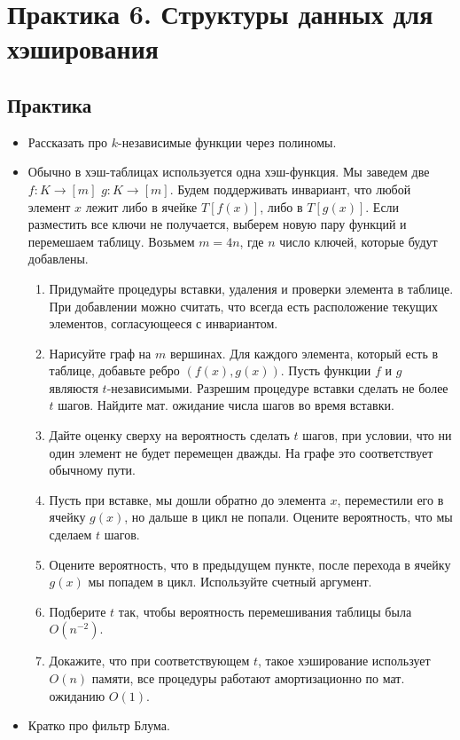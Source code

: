 \section{Практика 6. Структуры данных для хэширования}

\subsection{Практика}

\begin{itemize}
  \item Рассказать про $k$-независимые функции через полиномы.
 
  \item Обычно в хэш-таблицах используется одна хэш-функция. Мы заведем две $f : K \rightarrow [m]$
   $g : K \rightarrow [m]$. Будем поддерживать инвариант, что любой элемент $x$ лежит либо в ячейке
    $T[f(x)]$, либо в $T[g(x)]$. Если разместить все ключи не получается, выберем
    новую пару функций и перемешаем таблицу. Возьмем $m = 4n$, где $n$ число ключей,
    которые будут добавлены.

    \begin{enumerate}
      \item Придумайте процедуры вставки, удаления и проверки элемента в 
        таблице. При добавлении можно считать, что всегда есть расположение текущих
        элементов, согласующееся с инвариантом.

      \item Нарисуйте граф на $m$ вершинах. Для каждого элемента, который есть в таблице,
        добавьте ребро $(f(x), g(x))$. Пусть функции $f$ и $g$ являюстя $t$-независимыми.
        Разрешим процедуре вставки сделать не более $t$ шагов. Найдите мат. ожидание
        числа шагов во время вставки.

      \item Дайте оценку сверху на вероятность сделать $t$ шагов, при условии, что ни 
        один элемент не будет перемещен дважды. На графе это соответствует обычному пути.

      \item Пусть при вставке, мы дошли обратно до элемента $x$, переместили его в ячейку
        $g(x)$, но дальше в цикл не попали. Оцените вероятность, что мы сделаем $t$ шагов.
  
      \item Оцените вероятность, что в предыдущем пункте, после перехода в ячейку $g(x)$
        мы попадем в цикл. Используйте счетный аргумент.

      \item Подберите $t$ так, чтобы вероятность перемешивания таблицы была $O(n^{-2})$.
      
      \item Докажите, что при соответствующем $t$, такое хэширование использует $O(n)$ памяти,
        все процедуры работают амортизационно по мат. ожиданию $O(1)$.
        
    \end{enumerate}
  
   \item Кратко про фильтр Блума.
    
\end{itemize}

